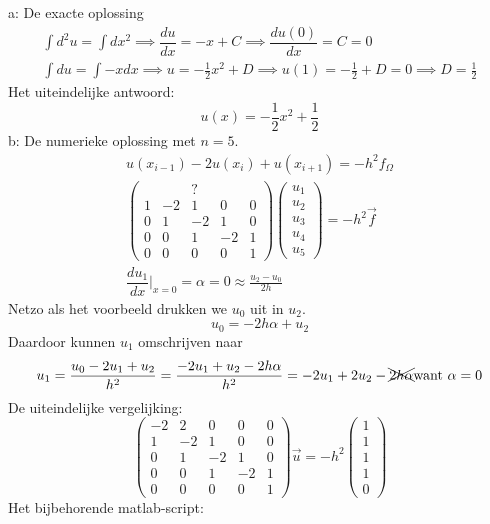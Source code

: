 \documentclass[11pt]{article}
\begin{document}
a: De exacte oplossing\\
\begin{gather*}
\int d^2u=\int dx^2 \implies \dfrac{du}{dx} = -x + C\implies \dfrac{du(0)}{dx} = C = 0\\
\int{du} = \int -x dx \implies u = -\frac{1}{2}x^2 + D \implies u(1) = -\frac{1}{2} + D = 0 \implies D = \frac{1}{2}
\end{gather*}
Het uiteindelijke antwoord:
$$u(x) = -\frac{1}{2}x^2 + \frac{1}{2}$$
b: De numerieke oplossing met $n = 5$.
\begin{gather*}
u(x_{i-1}) - 2u(x_{i}) + u(x_{i+1}) = -h^2f_{\Omega}\\
\begin{pmatrix}
	  &  & ?&  &  \\
	 1&-2& 1& 0& 0\\
	 0& 1&-2& 1& 0\\
	 0& 0& 1&-2& 1\\
	 0& 0& 0& 0& 1
\end{pmatrix}
\begin{pmatrix}
	u_{1}\\
	u_{2}\\
	u_{3}\\
	u_{4}\\
	u_{5}
\end{pmatrix}=-h^2\vec{f}\\
\dfrac{du_{1}}{dx}\Big|_{x = 0} = \alpha = 0\approx \frac{u_{2}-u_{0}}{2h}
\end{gather*}
Netzo als het voorbeeld drukken we $u_{0}$ uit in $u_{2}$.
$$
u_{0} = -2h\alpha + u_{2}
$$
Daardoor kunnen $u_{1}$ omschrijven naar
$$
u_{1} = \frac{u_{0}-2u_{1}+u_{2}}{h^2} = \frac{-2u_{1}+u_{2}-2h\alpha}{h^2} = -2u_{1} + 2u_{2} - \xcancel{2h\alpha} \text{want } \alpha = 0
$$
De uiteindelijke vergelijking:
$$
\begin{pmatrix}
	-2& 2& 0& 0& 0\\
	 1&-2& 1& 0& 0\\
	 0& 1&-2& 1& 0\\
	 0& 0& 1&-2& 1\\
	 0& 0& 0& 0& 1
\end{pmatrix}
\vec{u} = -h^2
\begin{pmatrix}
1\\
1\\
1\\
1\\
0
\end{pmatrix}
$$
\newpage
Het bijbehorende matlab-script:
\end{document}
